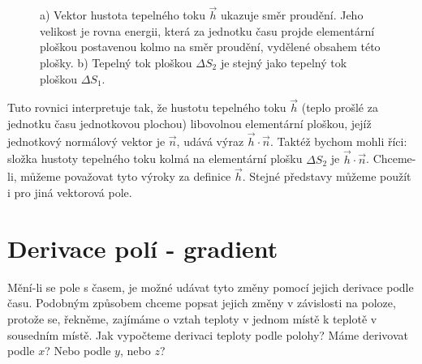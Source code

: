     \begin{figure}[ht!]
      \centering
       \newline                                          
      \caption{a) Vektor hustota tepelného toku $\vec{h}$ ukazuje směr proudění. Jeho velikost
                je rovna energii, která za jednotku času projde elementární ploškou postavenou 
                kolmo na směr proudění, vydělené obsahem této plošky. b) Tepelný tok ploškou 
                $\Delta S_2$ je stejný jako tepelný tok ploškou $\Delta S_1$.
                \cite[s.~30]{Feynman02}}
      \label{fyz:fig153}
    \end{figure}
    
    Tuto rovnici interpretuje tak, že hustotu tepelného toku $\vec{h}$ (teplo prošlé za jednotku 
    času jednotkovou plochou) libovolnou elementární ploškou, jejíž jednotkový normálový vektor 
    je $\vec{n}$, udává výraz $\vec{h}\cdot\vec{n}$. Taktéž bychom mohli říci: složka hustoty 
    tepelného toku kolmá na elementární plošku $\Delta S_2$ je $\vec{h}\cdot\vec{n}$. Chceme-li, 
    můžeme považovat tyto výro\-ky za definice $\vec{h}$. Stejné představy můžeme použít i pro 
    jiná vektorová pole.
        
  \section{Derivace polí - gradient}\label{fyz:IIchapIIsecIV}
    Mění-li se pole s časem, je možné udávat tyto změny pomocí jejich derivace podle času. Podobným 
    způsobem chceme popsat jejich změny v závislosti na poloze, protože se, řekněme, zajímáme o 
    vztah teploty v jednom místě k teplotě v sousedním místě. Jak vypočteme derivaci teploty podle 
    polohy? Máme derivovat podle $x$? Nebo podle $y$, nebo $z$?
  

